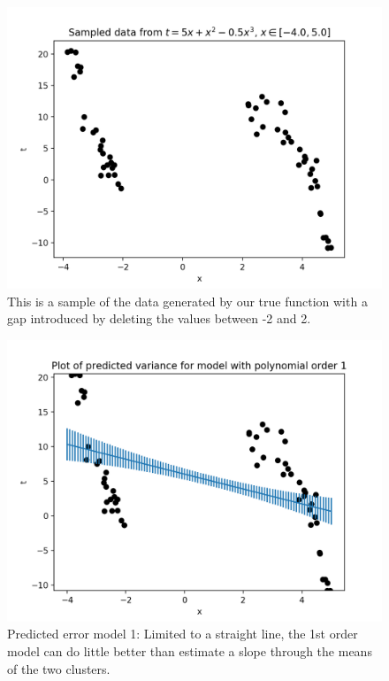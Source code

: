 \documentclass[10pt]{article}
\begin{document}
\begin{itemize}
\begin{figure}[H]
\centering
  \includegraphics[width=\linewidth]{data.png}
 \caption{This is a sample of the data generated by our true 
 function with a gap introduced by deleting the values between -2 and 2.}
\label{label}
\end{figure}

\begin{figure}[H]
\centering
  \includegraphics[width=\linewidth]{error-1.png}
 \caption{Predicted error model 1: Limited to a straight line, the 1st order model can do little better than estimate a slope through the means of the two clusters.}
\label{label}
\end{figure}


\end{itemize}
\end{document}

